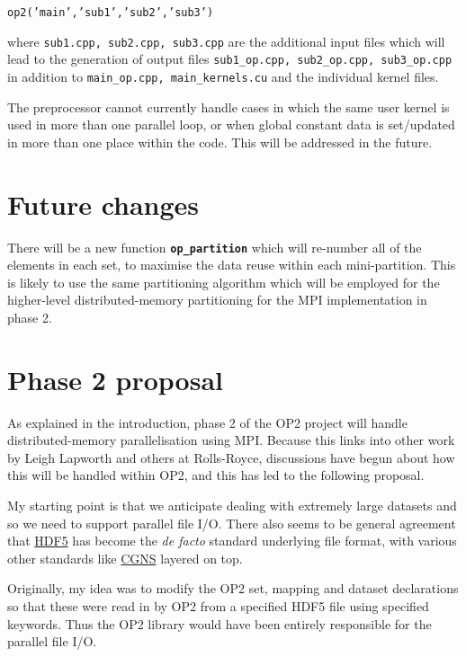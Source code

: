 \documentclass[11pt]{article}
\begin{document}
{\tt op2('main','sub1','sub2','sub3')}

\noindent
where {\tt sub1.cpp, sub2.cpp, sub3.cpp} are the additional input files which will 
lead to the generation of output files {\tt sub1\_op.cpp, sub2\_op.cpp, sub3\_op.cpp} 
in addition to {\tt main\_op.cpp, main\_kernels.cu} and the individual kernel files.

The preprocessor cannot currently handle cases in which the same user kernel is 
used in more than one parallel loop, or when global constant data is set/updated 
in more than one place within the code.  This will be addressed in the future.


\section{Future changes}

There will be a new function {\tt \bf op\_partition} which will re-number 
all of the elements in each set, to maximise the data reuse within each 
mini-partition.  This is likely to use the same partitioning algorithm which
will be employed for the higher-level distributed-memory partitioning for the
MPI implementation in phase 2.

\newpage

\section{Phase 2 proposal}

As explained in the introduction, phase 2 of the OP2 project will handle 
distributed-memory parallelisation using MPI.  Because this links into other
work by Leigh Lapworth and others at Rolls-Royce, discussions have
begun about how this will be handled within OP2, and this has led to the 
following proposal.

My starting point is that we anticipate dealing with extremely large datasets
and so we need to support parallel file I/O.  There also seems to be
general agreement that 
\href{http://www.hdfgroup.org/HDF5/}{HDF5}
has become the {\it de facto} standard underlying file format, 
with various other standards like
\href{http://cgns.sourceforge.net/hdf5.html}{CGNS}
layered on top.

Originally, my idea was to modify the OP2 set, mapping and dataset declarations
so that these were read in by OP2 from a specified HDF5 file using specified 
keywords.  Thus the OP2 library would have been entirely responsible for the 
parallel file I/O.
\end{document}
